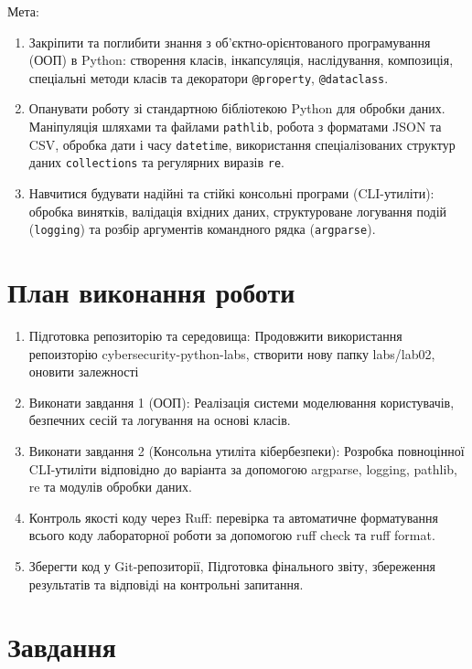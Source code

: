\documentclass[10pt, a4paper]{article}
\begin{document}

Мета:
\begin{enumerate}
	\item Закріпити та поглибити знання з об'єктно-орієнтованого програмування (ООП) в Python: створення класів, інкапсуляція, наслідування, композиція, спеціальні методи класів та декоратори \verb|@property|, \verb|@dataclass|.
	\item Опанувати роботу зі стандартною бібліотекою Python для обробки даних. Маніпуляція шляхами та файлами \verb|pathlib|, робота з форматами JSON та CSV, обробка дати і часу \verb|datetime|, використання спеціалізованих структур даних \verb|collections| та регулярних виразів \verb|re|.
	\item Навчитися будувати надійні та стійкі консольні програми (CLI-утиліти): обробка винятків, валідація вхідних даних, структуроване логування подій (\verb|logging|) та розбір аргументів командного рядка (\verb|argparse|).
\end{enumerate}
\section{План виконання роботи}
\begin{enumerate}
	\item Підготовка репозиторію та середовища: Продовжити використання репоизторію cybersecurity-python-labs, створити нову папку labs/lab02, оновити залежності
	\item Виконати завдання 1 (ООП): Реалізація системи моделювання користувачів, безпечних сесій та логування на основі класів.
	\item Виконати завдання 2 (Консольна утиліта кібербезпеки): Розробка повноцінної CLI-утиліти відповідно до варіанта за допомогою argparse, logging, pathlib, re та модулів обробки даних.
	\item Контроль якості коду через Ruff: перевірка та автоматичне форматування всього коду лабораторної роботи за допомогою ruff check та ruff format.
	\item Зберегти код у Git-репозиторії, Підготовка фінального звіту, збереження результатів та відповіді на контрольні запитання.
\end{enumerate}
\section{Завдання}
\end{document}
